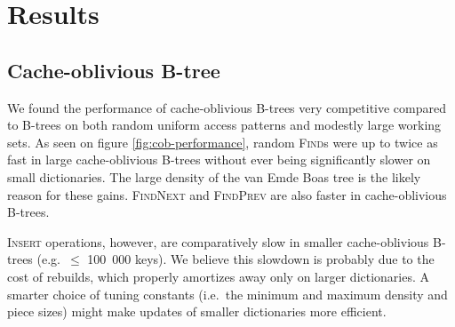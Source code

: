 \chapter{Results}
\label{chapter:results}

\section{Cache-oblivious B-tree}
We found the performance of cache-oblivious B-trees very competitive compared
to B-trees on both random uniform access patterns and modestly large working
sets. As seen on figure \ref{fig:cob-performance}, random \textsc{Find}s
were up to twice as fast in large cache-oblivious B-trees without ever being
significantly slower on small dictionaries.
The large density of the van Emde Boas tree is the likely reason for these
gains.
\textsc{FindNext} and \textsc{FindPrev} are also faster in cache-oblivious
B-trees.

\textsc{Insert} operations, however, are comparatively slow in
smaller cache-oblivious B-trees (e.g.\ $\leq$ 100~000 keys). We believe
this slowdown is probably due to the cost of rebuilds, which properly
amortizes away only on larger dictionaries. A smarter choice of tuning
constants (i.e.\ the minimum and maximum density and piece sizes) might
make updates of smaller dictionaries more efficient.

